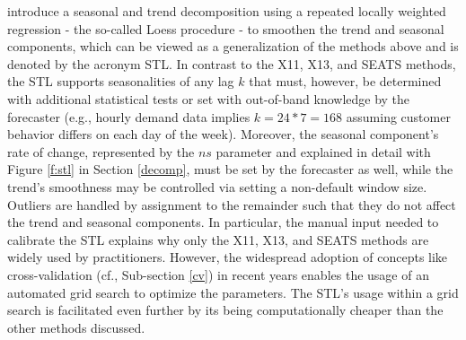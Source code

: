 \cite{cleveland1990} introduce a seasonal and trend decomposition using a
    repeated locally weighted regression - the so-called Loess procedure - to
    smoothen the trend and seasonal components, which can be viewed as a
    generalization of the methods above and is denoted by the acronym STL.
In contrast to the X11, X13, and SEATS methods, the STL supports seasonalities
    of any lag $k$ that must, however, be determined with additional
    statistical tests or set with out-of-band knowledge by the forecaster
    (e.g., hourly demand data implies $k = 24 * 7 = 168$ assuming customer
    behavior differs on each day of the week).
Moreover, the seasonal component's rate of change, represented by the $ns$
    parameter and explained in detail with Figure \ref{f:stl} in Section
    \ref{decomp}, must be set by the forecaster as well, while the trend's
    smoothness may be controlled via setting a non-default window size.
Outliers are handled by assignment to the remainder such that they do not
    affect the trend and seasonal components.
In particular, the manual input needed to calibrate the STL explains why only
    the X11, X13, and SEATS methods are widely used by practitioners.
However, the widespread adoption of concepts like cross-validation (cf.,
    Sub-section \ref{cv}) in recent years enables the usage of an automated
    grid search to optimize the parameters.
The STL's usage within a grid search is facilitated even further by its being
    computationally cheaper than the other methods discussed.
